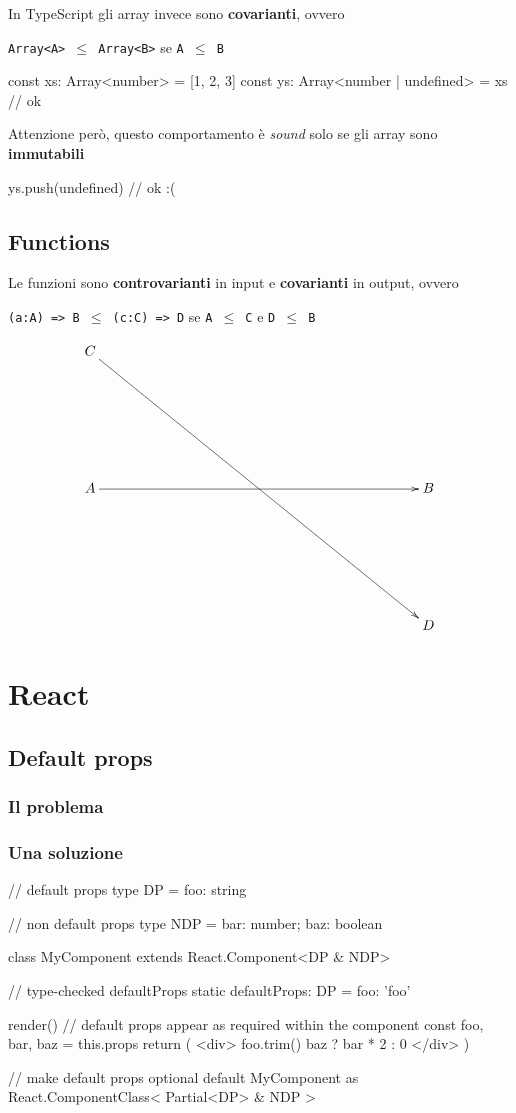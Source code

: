 \documentclass[12pt]{article}
\theoremstyle{definition}
\newenvironment{code}
  {\vspace{0.5cm} \VerbatimEnvironment\begin{typescriptcode}}
  {\end{typescriptcode} \vspace{0.2cm}}
\begin{document}
In TypeScript gli array invece sono \textbf{covarianti}, ovvero

\texttt{Array<A> $\leq$ Array<B>} se \texttt{A $\leq$ B}

\begin{code}
const xs: Array<number> = [1, 2, 3]
const ys: Array<number | undefined> = xs // ok
\end{code}

Attenzione però, questo comportamento è \emph{sound} solo se gli array sono \textbf{immutabili}

\begin{code}
ys.push(undefined) // ok :(
\end{code}

\subsection{Functions}

Le funzioni sono \textbf{controvarianti} in input e \textbf{covarianti} in output, ovvero

\texttt{(a:A) => B $\leq$ (c:C) => D} se \texttt{A $\leq$ C} e \texttt{D $\leq$ B}

\[
\xymatrixrowsep{3cm}
\xymatrixcolsep{8cm}
\xymatrix{
  C \ar[rdd] \\
  A \ar[r] & B \\
    & D \\
}
\]

\newpage
\section{React}

\subsection{Default props}

\subsubsection{Il problema}

\subsubsection{Una soluzione}

\begin{code}
// default props
type DP = { foo: string }

// non default props
type NDP = { bar: number; baz: boolean }

class MyComponent extends React.Component<DP & NDP> {
  // type-checked defaultProps
  static defaultProps: DP = { foo: 'foo' }

  render() {
    // default props appear as required within the component
    const { foo, bar, baz } = this.props
    return (
      <div>
        {foo.trim()} {baz ? bar * 2 : 0}
      </div>
    )
  }
}

// make default props optional
default MyComponent as React.ComponentClass<
  Partial<DP> & NDP
>
\end{code}
\end{document}
